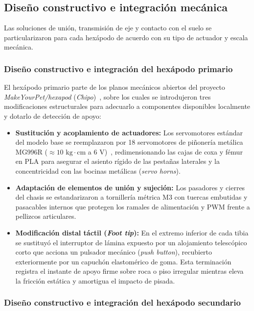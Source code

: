 \subsection{Diseño constructivo e integración mecánica}

Las soluciones de unión, transmisión de eje y contacto con el suelo se particularizaron para cada hexápodo de acuerdo con su tipo de actuador y escala mecánica.

\subsubsection{Diseño constructivo e integración del hexápodo primario}

El hexápodo primario parte de los planos mecánicos abiertos del proyecto \textit{MakeYourPet/hexapod} (\textit{Chipo})~\cite{MakeYourPetHexapod}, sobre los cuales se introdujeron tres modificaciones estructurales para adecuarlo a componentes disponibles localmente y dotarlo de detección de apoyo:

\begin{itemize}
    \item \textbf{Sustitución y acoplamiento de actuadores:} Los servomotores estándar del modelo base se reemplazaron por 18 servomotores de piñonería metálica MG996R ($\approx 10\text{ kg}\cdot\text{cm}$ a $6\text{ V}$)~\cite{MG996R_Datasheet}, redimensionando las cajas de coxa y fémur en PLA para asegurar el asiento rígido de las pestañas laterales y la concentricidad con las bocinas metálicas (\textit{servo horns}).
    \item \textbf{Adaptación de elementos de unión y sujeción:} Los pasadores y cierres del chasis se estandarizaron a tornillería métrica M3 con tuercas embutidas y pasacables internos que protegen los ramales de alimentación y PWM frente a pellizcos articulares.
    \item \textbf{Modificación distal táctil (\textit{Foot tip}):} En el extremo inferior de cada tibia se sustituyó el interruptor de lámina expuesto por un alojamiento telescópico corto que acciona un pulsador mecánico (\textit{push button}), recubierto exteriormente por un capuchón elastomérico de goma. Esta terminación registra el instante de apoyo firme sobre roca o piso irregular mientras eleva la fricción estática y amortigua el impacto de pisada.
\end{itemize}

\subsubsection{Diseño constructivo e integración del hexápodo secundario}

